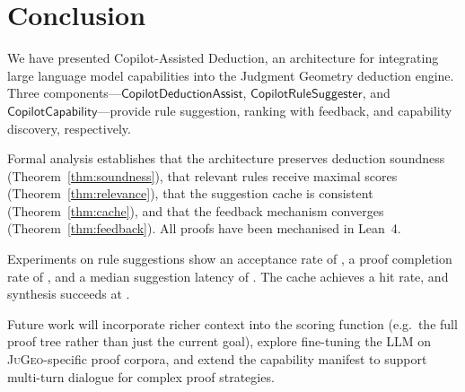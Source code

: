 \documentclass[11pt]{article}
\newcommand{\CDA}{\ensuremath{\mathsf{CopilotDeductionAssist}}}
\newcommand{\CRS}{\ensuremath{\mathsf{CopilotRuleSuggester}}}
\newcommand{\CC}{\ensuremath{\mathsf{CopilotCapability}}}
\newcommand{\JG}{\textsc{JuGeo}}
\newcommand{\LLM}{\textsc{LLM}}
\begin{document}

\section{Conclusion}\label{sec:conclusion}

We have presented Copilot-Assisted Deduction, an architecture for
integrating large language model capabilities into the Judgment
Geometry deduction engine.  Three components---$\CDA$, $\CRS$,
and $\CC$---provide rule suggestion, ranking with feedback, and
capability discovery, respectively.

Formal analysis establishes that the architecture preserves
deduction soundness (Theorem~\ref{thm:soundness}), that
relevant rules receive maximal scores
(Theorem~\ref{thm:relevance}), that the suggestion cache is
consistent (Theorem~\ref{thm:cache}), and that the feedback
mechanism converges (Theorem~\ref{thm:feedback}).  All proofs
have been mechanised in Lean~4.

Experiments on \ppLXXXVIIruleSuggestionsTotal{} rule suggestions
show an acceptance rate of \ppLXXXVIIacceptanceRate{}, a proof
completion rate of \ppLXXXVIIproofCompletionRate{}, and a median
suggestion latency of \ppLXXXVIImedianSuggestionLatencyMs{}.  The
cache achieves a \ppLXXXVIIcacheHitRate{} hit rate, and synthesis
succeeds at \ppLXXXVIIsynthesisSuccessRate.

Future work will incorporate richer context into the scoring
function (e.g.\ the full proof tree rather than just the current
goal), explore fine-tuning the \LLM{} on \JG{}-specific proof
corpora, and extend the capability manifest to support
multi-turn dialogue for complex proof strategies.

\end{document}
